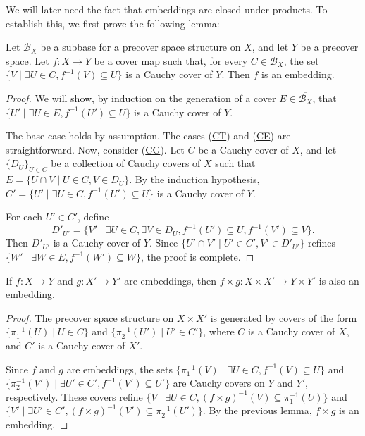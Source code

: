 \documentclass[reqno]{amsart}
\newcommand{\axref}[1]{(\hyperref[ax:#1]{#1})}
\theoremstyle{definition}
\theoremstyle{remark}
\numberwithin{figure}{section}
\begin{document}
We will later need the fact that embeddings are closed under products.  
To establish this, we first prove the following lemma:  

\begin{lem}
Let $\mathcal{B}_X$ be a subbase for a precover space structure on $X$, and let $Y$ be a precover space.  
Let $f : X \to Y$ be a cover map such that, for every $C \in \mathcal{B}_X$, the set $\{ V \mid \exists U \in C, f^{-1}(V) \subseteq U \}$ is a Cauchy cover of $Y$.
Then $f$ is an embedding.
\end{lem}
\begin{proof}
We will show, by induction on the generation of a cover $E \in \overline{\mathcal{B}_X}$, that $\{ U' \mid \exists U \in E, f^{-1}(U') \subseteq U \}$ is a Cauchy cover of $Y$.

The base case holds by assumption.
The cases \axref{CT} and \axref{CE} are straightforward.  
Now, consider \axref{CG}.
Let $C$ be a Cauchy cover of $X$, and let $\{ D_U \}_{U \in C}$ be a collection of Cauchy covers of $X$ such that $E = \{ U \cap V \mid U \in C, V \in D_U \}$.
By the induction hypothesis, $C' = \{ U' \mid \exists U \in C, f^{-1}(U') \subseteq U \}$ is a Cauchy cover of $Y$.

For each $U' \in C'$, define
\[ D'_{U'} = \{ V' \mid \exists U \in C, \exists V \in D_U, f^{-1}(U') \subseteq U, f^{-1}(V') \subseteq V \}. \]
Then $D'_{U'}$ is a Cauchy cover of $Y$.  
Since $\{ U' \cap V' \mid U' \in C', V' \in D'_{U'} \}$ refines $\{ W' \mid \exists W \in E, f^{-1}(W') \subseteq W \}$, the proof is complete.  
\end{proof}

\begin{lem}
If $f : X \to Y$ and $g : X' \to Y'$ are embeddings, then $f \times g : X \times X' \to Y \times Y'$ is also an embedding.  
\end{lem}
\begin{proof}
The precover space structure on $X \times X'$ is generated by covers of the form $\{ \pi_1^{-1}(U) \mid U \in C \}$ and $\{ \pi_2^{-1}(U') \mid U' \in C' \}$,
where $C$ is a Cauchy cover of $X$, and $C'$ is a Cauchy cover of $X'$.

Since $f$ and $g$ are embeddings, the sets $\{ \pi_1^{-1}(V) \mid \exists U \in C, f^{-1}(V) \subseteq U \}$
and $\{ \pi_2^{-1}(V') \mid \exists U' \in C', f^{-1}(V') \subseteq U' \}$ are Cauchy covers on $Y$ and $Y'$, respectively.
These covers refine $\{ V \mid \exists U \in C, (f \times g)^{-1}(V) \subseteq \pi_1^{-1}(U) \}$
and $\{ V' \mid \exists U' \in C', (f \times g)^{-1}(V') \subseteq \pi_2^{-1}(U') \}$.
By the previous lemma, $f \times g$ is an embedding.  
\end{proof}
\end{document}
